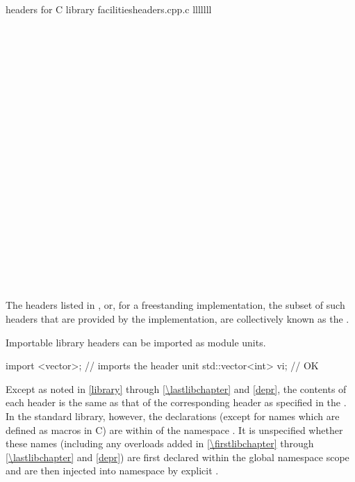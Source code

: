 \begin{multicolfloattable}{\Cpp{} headers for C library facilities}{headers.cpp.c}
{lllllll}
 \\
 \\
 \\
\columnbreak
{} \\
 \\
 \\
\columnbreak
{} \\
 \\
 \\
\columnbreak
{} \\
 \\
 \\
\columnbreak
{} \\
 \\
 \\
\columnbreak
{} \\
 \\
 \\
\columnbreak
{} \\
 \\
 \\
\end{multicolfloattable}

\pnum
The headers listed in , or,
for a freestanding implementation,
the subset of such headers that are provided by the implementation,
are collectively known as
the .
\begin{note}
Importable \Cpp{} library headers can be
imported as module units.
\end{note}
\begin{example}
\begin{codeblock}
import <vector>;                // imports the  header unit
std::vector<int> vi;            // OK
\end{codeblock}
\end{example}

\pnum
Except as noted in \ref{library} through \ref{\lastlibchapter}
and \ref{depr}, the contents of each header  is
the same as that of the corresponding header  as
specified in the .
In the \Cpp{} standard library, however, the
declarations (except for names which are defined as macros in C) are within
 of the namespace .
It is unspecified whether these names (including any overloads added in
\ref{\firstlibchapter} through \ref{\lastlibchapter} and \ref{depr})
are first declared within the global namespace scope
and are then injected into namespace  by explicit
.

